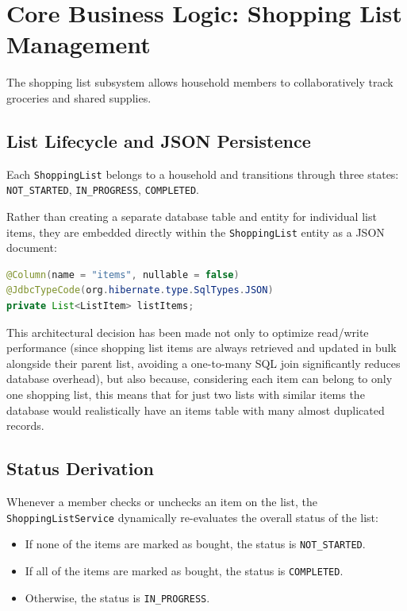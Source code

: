 \section{Core Business Logic: Shopping List Management}
\label{sec:core-shopping_list_management}
The shopping list subsystem allows household members to collaboratively track groceries and shared supplies.

\subsection{List Lifecycle and JSON Persistence}
Each \texttt{ShoppingList} belongs to a household and transitions through three states: \texttt{NOT\_STARTED}, \texttt{IN\_PROGRESS}, \texttt{COMPLETED}.

Rather than creating a separate database table and entity for individual list items, they are embedded directly within the \texttt{ShoppingList} entity as a JSON document:
\begin{lstlisting}[language=Java, caption=JSON Mapping for Shopping List Items]
@Column(name = "items", nullable = false)
@JdbcTypeCode(org.hibernate.type.SqlTypes.JSON)
private List<ListItem> listItems;
\end{lstlisting}
This architectural decision has been made not only to optimize read/write performance (since shopping list items are always retrieved and updated in bulk alongside their parent list, avoiding a one-to-many SQL join significantly reduces database overhead), but also because, considering each item can belong to only one shopping list, this means that for just two lists with similar items the database would realistically have an items table with many almost duplicated records. 

\subsection{Status Derivation}
Whenever a member checks or unchecks an item on the list, the \texttt{ShoppingListService} dynamically re-evaluates the overall status of the list:
\begin{itemize}
    \item If none of the items are marked as bought, the status is \texttt{NOT\_STARTED}.
    \item If all of the items are marked as bought, the status is \texttt{COMPLETED}.
    \item Otherwise, the status is \texttt{IN\_PROGRESS}.
\end{itemize}